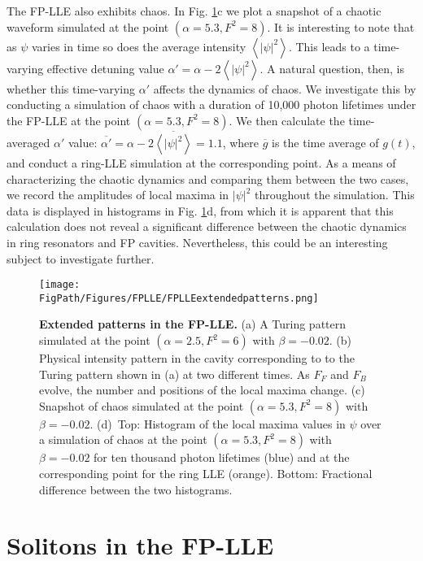 The FP-LLE also exhibits chaos. In Fig. \ref{fig:FPLLEextendedpatterns}c we plot a snapshot of a chaotic waveform simulated at the point $(\alpha=5.3, F^2=8)$. It is interesting to note that as $\psi$ varies in time so does the average intensity $\left<|\psi|^2\right>$. This leads to a time-varying effective detuning value $\alpha'=\alpha-2\left<|\psi|^2\right>$. A natural question, then, is whether this time-varying $\alpha'$ affects the dynamics of chaos. We investigate this by conducting a simulation of chaos with a duration of 10,000 photon lifetimes under the FP-LLE at the point $(\alpha=5.3, F^2=8)$. We then calculate the time-averaged $\alpha'$ value: $\overline{\alpha'}=\alpha-2\overline{\left<|\psi|^2\right>}=1.1$, where $\overline{g}$ is the time average of $g(t)$, and conduct a ring-LLE simulation at the corresponding point. As a means of characterizing the chaotic dynamics and comparing them between the two cases, we record the amplitudes of local maxima in $|\psi|^2$ throughout the simulation. This data is displayed in histograms in Fig. \ref{fig:FPLLEextendedpatterns}d, from which it is apparent that this calculation does not reveal a significant difference between the chaotic dynamics in ring resonators and FP cavities. Nevertheless, this could be an interesting subject to investigate further. 


\begin{figure}[htpb]
	\begin{center}
		\texttt{[image: \\FigPath/Figures/FPLLE/FPLLEextendedpatterns.png]}
	\end{center}
	\caption[Extended patterns in the FP-LLE]{\textbf{Extended patterns in the FP-LLE.} (a) A Turing pattern simulated at the point $(\alpha=2.5,F^2=6)$ with $\beta=-0.02$. (b) Physical intensity pattern in the cavity corresponding to to the Turing pattern shown in (a) at two different times. As $F_F$ and $F_B$ evolve, the number and positions of the local maxima change. (c) Snapshot of chaos simulated at the point $(\alpha=5.3,F^2=8)$ with $\beta=-0.02$. (d)~Top: Histogram of the local maxima values in $\psi$ over a simulation of chaos at the point $(\alpha=5.3,F^2=8)$ with $\beta=-0.02$ for ten thousand photon lifetimes (blue) and at the corresponding point for the ring LLE (orange). Bottom: Fractional difference between the two histograms.}
	\label{fig:FPLLEextendedpatterns}
\end{figure} 

\section{Solitons in the FP-LLE}


